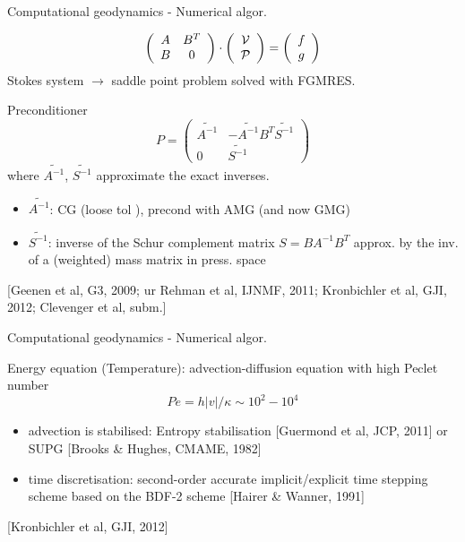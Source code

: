 \documentclass[handout]{beamer}
\begin{document}
\begin{frame}[plain]{Computational geodynamics - Numerical algor.}

\[
\left(
\begin{array}{cc}
A & B^T \\
B & 0 
\end{array}
\right)\cdot
\left(
\begin{array}{c}
{\cal V} \\ {\cal P}
\end{array}
\right)
=
\left(
\begin{array}{cc}
f \\ g
\end{array}
\right)
\]
Stokes system $\rightarrow$ saddle point problem solved with FGMRES. 

\pause

Preconditioner 
\[
P = 
\left(
\begin{array}{cc}
\widetilde{A^{-1}} & -\widetilde{A^{-1}} B^T \widetilde{S^{-1}}\\ 
0 & \widetilde{S^{-1}}
\end{array}
\right)
\]
where $\widetilde{A^{-1}}$, $\widetilde{S^{-1}}$ approximate the exact inverses. 

\begin{itemize}
\item $\widetilde{A^{-1}}$: CG (loose tol ), precond with AMG (and now GMG)
\item $\widetilde{S^{-1}}$: inverse of the Schur complement matrix $S=BA^{-1}B^T$ approx. by the inv. of 
a (weighted) mass matrix in press. space
\end{itemize}

{\tiny [Geenen et al, G3, 2009; ur Rehman et al, IJNMF, 2011; Kronbichler et al, GJI, 2012; Clevenger et al, subm.]}
\end{frame}



\begin{frame}[plain]{Computational geodynamics - Numerical algor.}

Energy equation (Temperature): advection-diffusion equation with high Peclet number
\[
Pe=h |v| / \kappa \sim 10^{2}-10^4
\]

\begin{itemize}
\item advection is stabilised:  
Entropy stabilisation {\tiny [Guermond et al, JCP, 2011]} or SUPG {\tiny [Brooks \& Hughes, CMAME, 1982]} 
\item 
time discretisation: second-order
accurate implicit/explicit time stepping scheme based on the BDF-2 scheme {\tiny [Hairer \& Wanner, 1991]}
\end{itemize} 


{\tiny [Kronbichler et al, GJI, 2012]}
\end{frame}
\end{document}

